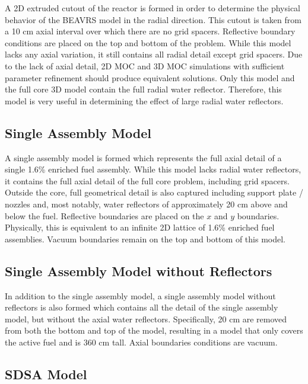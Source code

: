 A 2D extruded cutout of the reactor is formed in order to determine the physical behavior of the BEAVRS model in the radial direction. This cutout is taken from a 10 cm axial interval over which there are no grid spacers. Reflective boundary conditions are placed on the top and bottom of the problem. While this model lacks any axial variation, it still contains all radial detail except grid spacers. Due to the lack of axial detail, 2D \ac{MOC} and 3D \ac{MOC} simulations with sufficient parameter refinement should produce equivalent solutions. Only this model and the full core 3D model contain the full radial water reflector. Therefore, this model is very useful in determining the effect of large radial water reflectors. 

\subsection{Single Assembly Model}
\label{app:beavrs-single-assembly}

A single assembly model is formed which represents the full axial detail of a single 1.6\% enriched fuel assembly. While this model lacks radial water reflectors, it contains the full axial detail of the full core problem, including grid spacers. Outside the core, full geometrical detail is also captured including support plate / nozzles and, most notably, water reflectors of approximately 20 cm above and below the fuel. Reflective boundaries are placed on the $x$ and $y$ boundaries. Physically, this is equivalent to an infinite 2D lattice of 1.6\% enriched fuel assemblies. Vacuum boundaries remain on the top and bottom of this model. 

\subsection{Single Assembly Model without Reflectors}
\label{app:trunc-single-assembly}

In addition to the single assembly model, a single assembly model without reflectors is also formed which contains all the detail of the single assembly model, but without the axial water reflectors. Specifically, 20 cm are removed from both the bottom and top of the model, resulting in a model that only covers the active fuel and is 360 cm tall. Axial boundaries conditions are vacuum.

\subsection{SDSA Model}
\label{app:sdsa}

